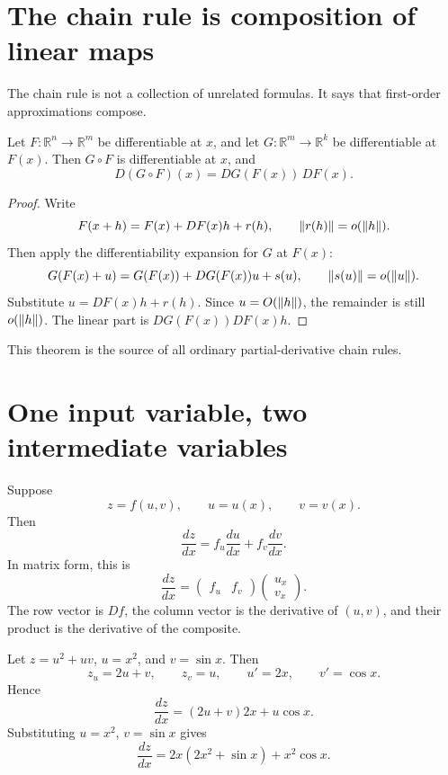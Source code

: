 
\section{The chain rule is composition of linear maps}

The chain rule is not a collection of unrelated formulas.  It says that first-order approximations compose.

\begin{theorem}
Let \(F:\mathbb R^n\to\mathbb R^m\) be differentiable at \(x\), and let \(G:\mathbb R^m\to\mathbb R^k\) be differentiable at \(F(x)\).  Then \(G\circ F\) is differentiable at \(x\), and
\[
  D(G\circ F)(x)=DG(F(x))\,DF(x).
\]
\end{theorem}

\begin{proof}
Write
\[
  F(x+h)=F(x)+DF(x)h+r(h),\qquad \left\lVert r(h) \right\rVert=o(\left\lVert h \right\rVert).
\]
Then apply the differentiability expansion for \(G\) at \(F(x)\):
\[
  G(F(x)+u)=G(F(x))+DG(F(x))u+s(u),
  \qquad \left\lVert s(u) \right\rVert=o(\left\lVert u \right\rVert).
\]
Substitute \(u=DF(x)h+r(h)\).  Since \(u=O(\left\lVert h \right\rVert)\), the remainder is still \(o(\left\lVert h \right\rVert)\).  The linear part is \(DG(F(x))DF(x)h\).
\end{proof}

This theorem is the source of all ordinary partial-derivative chain rules.

\section{One input variable, two intermediate variables}

Suppose
\[
  z=f(u,v),\qquad u=u(x),\qquad v=v(x).
\]
Then
\[
  \frac{dz}{dx}=f_u\frac{du}{dx}+f_v\frac{dv}{dx}.
\]
In matrix form, this is
\[
  \frac{dz}{dx}
  =
  \begin{pmatrix}f_u&f_v\end{pmatrix}
  \begin{pmatrix}u_x\\ v_x\end{pmatrix}.
\]
The row vector is \(Df\), the column vector is the derivative of \((u,v)\), and their product is the derivative of the composite.

\begin{example}
Let \(z=u^2+uv\), \(u=x^2\), and \(v=\sin x\).  Then
\[
  z_u=2u+v,\qquad z_v=u,\qquad u'=2x,\qquad v'=\cos x.
\]
Hence
\[
  \frac{dz}{dx}=(2u+v)2x+u\cos x.
\]
Substituting \(u=x^2\), \(v=\sin x\) gives
\[
  \frac{dz}{dx}=2x(2x^2+\sin x)+x^2\cos x.
\]
\end{example}

